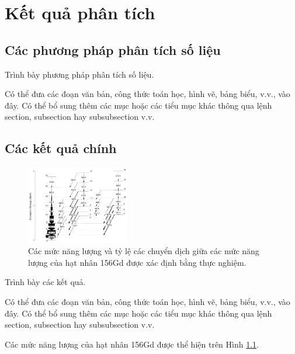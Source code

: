 \chapter{Kết quả phân tích}
\label{ch:ketquaphantich}


\section{Các phương pháp phân tích số liệu}

Trình bày phương pháp phân tích số liệu. 

Có thể đưa các đoạn văn bản, công thức toán học, hình vẽ, bảng biểu, v.v., vào đây. Có thể bổ sung thêm các mục hoặc các tiểu mục khác thông qua lệnh section, subsection hay subsubsection v.v.


\section{Các kết quả chính}

\begin{figure}[!h]
\centering
\includegraphics[width=0.4\textwidth]
{figure/fig_ketquaphantich/156Gd.png}
\caption{Các mức năng lượng và tỷ lệ các chuyển dịch giữa các mức năng lượng của hạt nhân 156Gd được xác định bằng thực nghiệm.}
\label{fig:156Gd}
\end{figure}

Trình bày các kết quả. 

Có thể đưa các đoạn văn bản, công thức toán học, hình vẽ, bảng biểu, v.v., vào đây. Có thể bổ sung thêm các mục hoặc các tiểu mục khác thông qua lệnh section, subsection hay subsubsection v.v.

Các mức năng lượng của hạt nhân 156Gd được thể hiện trên Hình \ref{fig:156Gd}.